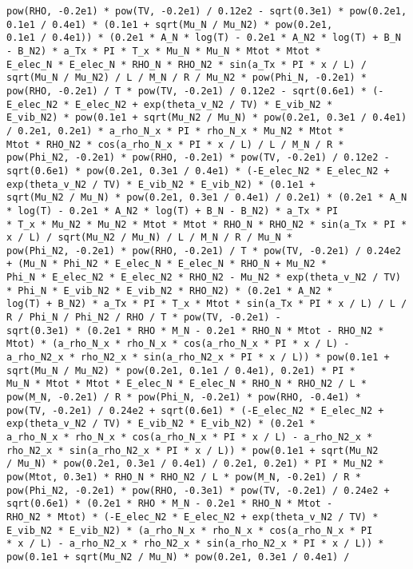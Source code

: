 \documentclass[10pt]{article}
\begin{document}
\begin{scriptsize}
\begin{verbatim}
pow(RHO, -0.2e1) * pow(TV, -0.2e1) / 0.12e2 - sqrt(0.3e1) * pow(0.2e1, 0.1e1 / 0.4e1) * (0.1e1 + sqrt(Mu_N / Mu_N2) * pow(0.2e1,
0.1e1 / 0.4e1)) * (0.2e1 * A_N * log(T) - 0.2e1 * A_N2 * log(T) + B_N - B_N2) * a_Tx * PI * T_x * Mu_N * Mu_N * Mtot * Mtot *
E_elec_N * E_elec_N * RHO_N * RHO_N2 * sin(a_Tx * PI * x / L) / sqrt(Mu_N / Mu_N2) / L / M_N / R / Mu_N2 * pow(Phi_N, -0.2e1) *
pow(RHO, -0.2e1) / T * pow(TV, -0.2e1) / 0.12e2 - sqrt(0.6e1) * (-E_elec_N2 * E_elec_N2 + exp(theta_v_N2 / TV) * E_vib_N2 *
E_vib_N2) * pow(0.1e1 + sqrt(Mu_N2 / Mu_N) * pow(0.2e1, 0.3e1 / 0.4e1) / 0.2e1, 0.2e1) * a_rho_N_x * PI * rho_N_x * Mu_N2 * Mtot *
Mtot * RHO_N2 * cos(a_rho_N_x * PI * x / L) / L / M_N / R * pow(Phi_N2, -0.2e1) * pow(RHO, -0.2e1) * pow(TV, -0.2e1) / 0.12e2 -
sqrt(0.6e1) * pow(0.2e1, 0.3e1 / 0.4e1) * (-E_elec_N2 * E_elec_N2 + exp(theta_v_N2 / TV) * E_vib_N2 * E_vib_N2) * (0.1e1 +
sqrt(Mu_N2 / Mu_N) * pow(0.2e1, 0.3e1 / 0.4e1) / 0.2e1) * (0.2e1 * A_N * log(T) - 0.2e1 * A_N2 * log(T) + B_N - B_N2) * a_Tx * PI
* T_x * Mu_N2 * Mu_N2 * Mtot * Mtot * RHO_N * RHO_N2 * sin(a_Tx * PI * x / L) / sqrt(Mu_N2 / Mu_N) / L / M_N / R / Mu_N *
pow(Phi_N2, -0.2e1) * pow(RHO, -0.2e1) / T * pow(TV, -0.2e1) / 0.24e2 + (Mu_N * Phi_N2 * E_elec_N * E_elec_N * RHO_N + Mu_N2 *
Phi_N * E_elec_N2 * E_elec_N2 * RHO_N2 - Mu_N2 * exp(theta_v_N2 / TV) * Phi_N * E_vib_N2 * E_vib_N2 * RHO_N2) * (0.2e1 * A_N2 *
log(T) + B_N2) * a_Tx * PI * T_x * Mtot * sin(a_Tx * PI * x / L) / L / R / Phi_N / Phi_N2 / RHO / T * pow(TV, -0.2e1) -
sqrt(0.3e1) * (0.2e1 * RHO * M_N - 0.2e1 * RHO_N * Mtot - RHO_N2 * Mtot) * (a_rho_N_x * rho_N_x * cos(a_rho_N_x * PI * x / L) -
a_rho_N2_x * rho_N2_x * sin(a_rho_N2_x * PI * x / L)) * pow(0.1e1 + sqrt(Mu_N / Mu_N2) * pow(0.2e1, 0.1e1 / 0.4e1), 0.2e1) * PI *
Mu_N * Mtot * Mtot * E_elec_N * E_elec_N * RHO_N * RHO_N2 / L * pow(M_N, -0.2e1) / R * pow(Phi_N, -0.2e1) * pow(RHO, -0.4e1) *
pow(TV, -0.2e1) / 0.24e2 + sqrt(0.6e1) * (-E_elec_N2 * E_elec_N2 + exp(theta_v_N2 / TV) * E_vib_N2 * E_vib_N2) * (0.2e1 *
a_rho_N_x * rho_N_x * cos(a_rho_N_x * PI * x / L) - a_rho_N2_x * rho_N2_x * sin(a_rho_N2_x * PI * x / L)) * pow(0.1e1 + sqrt(Mu_N2
/ Mu_N) * pow(0.2e1, 0.3e1 / 0.4e1) / 0.2e1, 0.2e1) * PI * Mu_N2 * pow(Mtot, 0.3e1) * RHO_N * RHO_N2 / L * pow(M_N, -0.2e1) / R *
pow(Phi_N2, -0.2e1) * pow(RHO, -0.3e1) * pow(TV, -0.2e1) / 0.24e2 + sqrt(0.6e1) * (0.2e1 * RHO * M_N - 0.2e1 * RHO_N * Mtot -
RHO_N2 * Mtot) * (-E_elec_N2 * E_elec_N2 + exp(theta_v_N2 / TV) * E_vib_N2 * E_vib_N2) * (a_rho_N_x * rho_N_x * cos(a_rho_N_x * PI
* x / L) - a_rho_N2_x * rho_N2_x * sin(a_rho_N2_x * PI * x / L)) * pow(0.1e1 + sqrt(Mu_N2 / Mu_N) * pow(0.2e1, 0.3e1 / 0.4e1) /

\end{verbatim}
\end{scriptsize}
\end{document}
